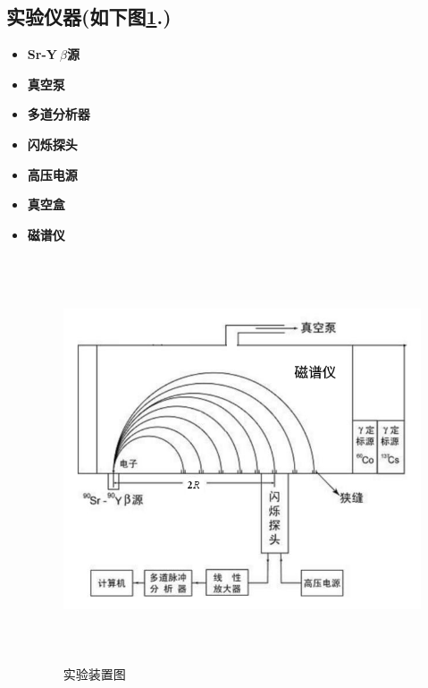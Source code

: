 \documentclass[a4paper]{article}
\begin{document}
\subsection{实验仪器(如下图\ref{fig:fig1}.)}\label{sub:sysover}
\begin{itemize}
\item{\textbf{Sr-Y$\ \beta$源}}
\item{\textbf{真空泵}}
\item{\textbf{多道分析器}}
\item{\textbf{闪烁探头}}
\item{\textbf{高压电源}}
\item{\textbf{真空盒}}
\item{\textbf{磁谱仪}}
\begin{figure}[ht]
 \centering
 \includegraphics[height=12cm, width=14cm]{images/app.png}
 \caption{实验装置图}
 \label{fig:fig1}
\end{figure}\\\\
\end{itemize}

\newpage
\end{document}
